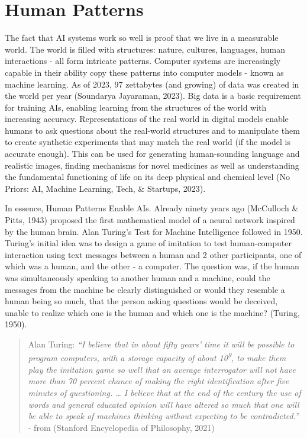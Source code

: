 \documentclass[
  letterpaper,
  DIV=11,
  numbers=noendperiod]{scrartcl}
\begin{document}
\section{Human Patterns}\label{human-patterns}

The fact that AI systems work so well is proof that we live in a
measurable world. The world is filled with structures: nature, cultures,
languages, human interactions - all form intricate patterns. Computer
systems are increasingly capable in their ability copy these patterns
into computer models - known as machine learning. As of 2023, 97
zettabytes (and growing) of data was created in the world per year
(Soundarya Jayaraman, 2023). Big data is a basic requirement for
training AIs, enabling learning from the structures of the world with
increasing accuracy. Representations of the real world in digital models
enable humans to ask questions about the real-world structures and to
manipulate them to create synthetic experiments that may match the real
world (if the model is accurate enough). This can be used for generating
human-sounding language and realistic images, finding mechanisms for
novel medicines as well as understanding the fundamental functioning of
life on its deep physical and chemical level (No Priors: AI, Machine
Learning, Tech, \& Startups, 2023).

In essence, Human Patterns Enable AIs. Already ninety years ago
(McCulloch \& Pitts, 1943) proposed the first mathematical model of a
neural network inspired by the human brain. Alan Turing's Test for
Machine Intelligence followed in 1950. Turing's initial idea was to
design a game of imitation to test human-computer interaction using text
messages between a human and 2 other participants, one of which was a
human, and the other - a computer. The question was, if the human was
simultaneously speaking to another human and a machine, could the
messages from the machine be clearly distinguished or would they
resemble a human being so much, that the person asking questions would
be deceived, unable to realize which one is the human and which one is
the machine? (Turing, 1950).

\begin{quote}
Alan Turing: \emph{``I believe that in about fifty years' time it will
be possible to program computers, with a storage capacity of about
10\textsuperscript{9}, to make them play the imitation game so well that
an average interrogator will not have more than 70 percent chance of
making the right identification after five minutes of questioning.
\ldots{} I believe that at the end of the century the use of words and
general educated opinion will have altered so much that one will be able
to speak of machines thinking without expecting to be contradicted.''} -
from (Stanford Encyclopedia of Philosophy, 2021)
\end{quote}
\end{document}

